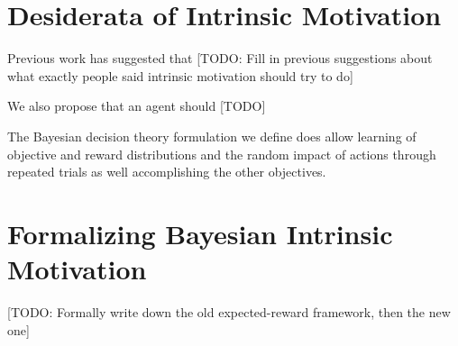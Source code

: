 \documentclass{article}
\begin{document}
\section{Desiderata of Intrinsic Motivation}

Previous work has suggested that [TODO: Fill in previous suggestions about what exactly people said intrinsic motivation should try to do]

We also propose that an agent should [TODO]



The Bayesian decision theory formulation we define does allow learning of objective and reward distributions and the random impact of actions through repeated trials as well accomplishing the other objectives.


\section{Formalizing Bayesian Intrinsic Motivation}

[TODO: Formally write down the old expected-reward framework, then the new one]
\end{document}
